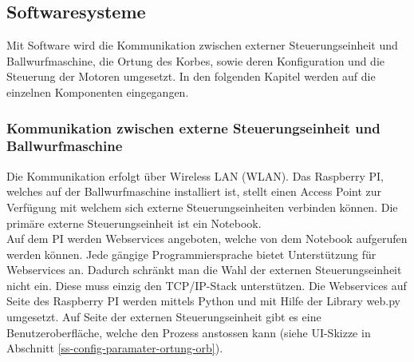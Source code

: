 \subsection{Softwaresysteme}
Mit Software wird die Kommunikation zwischen externer Steuerungseinheit und Ballwurfmaschine, die Ortung des Korbes, sowie deren Konfiguration und die Steuerung der Motoren umgesetzt. In den folgenden Kapitel werden auf die einzelnen Komponenten eingegangen.

\subsubsection{Kommunikation zwischen externe Steuerungseinheit und Ballwurfmaschine}
Die Kommunikation erfolgt über Wireless LAN (WLAN). Das Raspberry PI, welches auf der Ballwurfmaschine installiert ist, stellt einen Access Point zur Verfügung mit welchem sich externe Steuerungseinheiten verbinden können. Die primäre externe Steuerungseinheit ist ein Notebook.\\
Auf dem PI werden Webservices angeboten, welche von dem Notebook aufgerufen werden können. Jede gängige Programmiersprache bietet Unterstützung für Webservices an. Dadurch schränkt man die Wahl der externen Steuerungseinheit nicht ein. Diese muss einzig den TCP/IP-Stack unterstützen. Die Webservices auf Seite des Raspberry PI werden mittels Python und mit Hilfe der Library web.py umgesetzt. Auf Seite der externen Steuerungseinheit gibt es eine Benutzeroberfläche, welche den Prozess anstossen kann (siehe UI-Skizze in Abschnitt \ref{ss-config-paramater-ortung-orb}).

